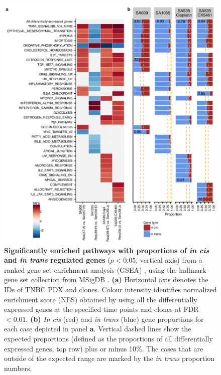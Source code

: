 \begin{figure}
\centering
  \includegraphics[width=\textwidth]{Figures/chap5/fig13_common_pathways.pdf}
\caption[Gene pathway enrichment analysis of PDX timeseries]
	{\small
	\textbf{Significantly enriched pathways with proportions of \textit{in cis} and  \textit{ in trans} regulated genes} ($p < 0.05$, vertical axis) from a ranked gene set enrichment analysis (GSEA) \cite{shi2007gene}, using the hallmark gene set collection from MSigDB \cite{liberzon2015molecular}. \textbf{(a)} Horizontal axis denotes the IDs of TNBC PDX and clones. Colour intensity identifies normalized enrichment score (NES) obtained by using all the differentially expressed genes at the specified time points and clones at FDR $< 0.01$. \textbf{(b)} \textit{In cis} (red) and \textit{in trans} (blue) gene proportions for each case depicted in panel \textbf{a}. Vertical dashed lines show the expected proportions (defined as the proportions of all differentially expressed genes, top row) plus or minus 10\%. The cases that are outside of the expected range are marked by the \textit{in trans} proportion numbers.
	}
	\label{fig:pathwaysnetworkcistrans}
\end{figure}


